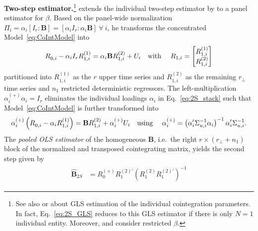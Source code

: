 \textbf{Two-step estimator.}\footnote{See also \citet[Ch.~7.2.2]{Lutkepohl2005} or \citet{BruggemannLutkepohl2005} about GLS estimation of the individual cointegration parameters. In fact, Eq.~\eqref{eq:2S_GLS} reduces to this GLS estimator if there is only $ N=1 $ individual entity. Moreover, \citet[Ch.~7.3.2]{Lutkepohl2005} and \citet[p.~159]{Breitung2005} consider restricted $ \beta $.} 
\citet{Breitung2005} extends the individual two-step estimator by \citet{AhnReisel1990} to a panel estimator for $\beta$. Based on the panel-wide normalization $\Pi_i = \alpha_i \left[I_r : \mathbf{B} \right] = \left[ \alpha_i I_r : \alpha_i \mathbf{B} \right] \ \forall \ i $, he transforms the concentrated Model~\eqref{eq:CoIntModel} into
\begin{align} \label{eq:2S_stack}
\begin{split}
	R^{\ }_{0,i} - \alpha_i I_r R_{1,i}^{(1)} & = \alpha_i \mathbf{B} R_{1,i}^{(2)} + U_{i} \text{\quad with \quad}
	R_{1,i} = \begin{bmatrix} R_{1,i}^{(1)} \\ R_{1,i}^{(2)} \end{bmatrix} \\
\end{split}
\end{align}
partitioned into $ R_{1,i}^{(1)} $ as the $ r $ upper time series and $ R_{1,i}^{(2)} $ as the remaining $ r_\perp $ time series and $ n_1 $ restricted deterministic regressors. The left-multiplication $ \alpha_{i}^{(+)} \alpha_i = I_r $ eliminates the individual loadings $ \alpha_{i} $ in Eq.~\eqref{eq:2S_stack} such that Model~\eqref{eq:CoIntModel} is further transformed into
\begin{align} \label{eq:2S_aux}
\begin{split}
	\alpha_{i}^{(+)} \left(R^{\ }_{0,i} - \alpha_{i} R_{1,i}^{(1)} \right) & = \mathbf{B} R_{1,i}^{(2)} + \alpha_{i}^{(+)} U_{i} \text{\quad using \quad} \alpha_{i}^{(+)} = \left( \alpha_i' \Sigma_{u,i}^{-1} \alpha_i \right)^{-1} \alpha_i' \Sigma_{u,i}^{-1}. \\
\end{split}
\end{align}
The \textit{pooled OLS estimator} of the homogeneous $ \mathbf{B} $, i.e.~the right $ r \times \left( r_\perp + n_1 \right) $ block of the normalized and transposed cointegrating matrix, yields the second step given by
\begin{align} \label{eq:2S_GLS}
\begin{split}
	\widehat{\mathbf{B}}_{2S} & = R_0^{(+)} R_1^{(2)'} \left( R_1^{(2)} R_1^{(2)'} \right)^{-1}
\end{split}
\end{align}
